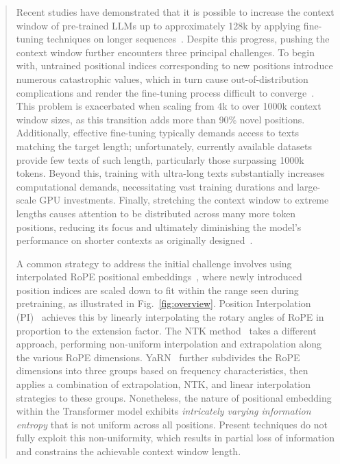 \begin{abstract}
Recent studies have demonstrated that it is possible to increase the context window of pre-trained LLMs up to approximately 128k by applying fine-tuning techniques on longer sequences~\cite{longlora,pi,yarn,zhang2024soaring,liu2023scaling}. Despite this progress, pushing the context window further encounters three principal challenges. To begin with, untrained positional indices corresponding to new positions introduce numerous catastrophic values, which in turn cause out-of-distribution complications and render the fine-tuning process difficult to converge~\cite{pi}. This problem is exacerbated when scaling from 4k to over 1000k context window sizes, as this transition adds more than 90\% novel positions. Additionally, effective fine-tuning typically demands access to texts matching the target length; unfortunately, currently available datasets provide few texts of such length, particularly those surpassing 1000k tokens. Beyond this, training with ultra-long texts substantially increases computational demands, necessitating vast training durations and large-scale GPU investments. Finally, stretching the context window to extreme lengths causes attention to be distributed across many more token positions, reducing its focus and ultimately diminishing the model’s performance on shorter contexts as originally designed~\cite{pi}.

A common strategy to address the initial challenge involves using interpolated RoPE positional embeddings~\cite{rope,pi}, where newly introduced position indices are scaled down to fit within the range seen during pretraining, as illustrated in Fig.~\ref{fig:overview}. Position Interpolation (PI)~\cite{pi} achieves this by linearly interpolating the rotary angles of RoPE in proportion to the extension factor. The NTK method~\cite{ntk,dynamicntk} takes a different approach, performing non-uniform interpolation and extrapolation along the various RoPE dimensions. YaRN~\cite{yarn} further subdivides the RoPE dimensions into three groups based on frequency characteristics, then applies a combination of extrapolation, NTK, and linear interpolation strategies to these groups. Nonetheless, the nature of positional embedding within the Transformer model exhibits \emph{intricately varying information entropy} that is not uniform across all positions. Present techniques do not fully exploit this non-uniformity, which results in partial loss of information and constrains the achievable context window length.


\end{abstract}
